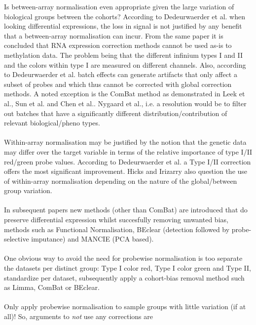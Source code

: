\documentclass[a4paper,10pt]{article}
\begin{document}
Is between-array normalisation even appropriate given the large variation of biological groups between the cohorts?
According to Dedeurwaerder et al.\cite{Dedeurwaerder2014} when looking differential expressions, the loss in signal is not justified by any benefit that a between-array normalisation can incur. From the same paper it is concluded
that RNA expression correction methods cannot be used as-is to methylation data. The problem being that the different infinium types I and II and the colors within type I are measured on different channels. Also, according to Dedeurwaerder et al. batch effects can generate artifacts that only affect a subset of probes and which thus cannot be corrected with global correction methods. A noted exception is the ComBat\cite{Johnson2007} method as demonstrated in Leek et al.\cite{Leek2010}, Sun et al.\cite{Sun2011} and
Chen et al.\cite{Chen2011}. Nygaard et al.\cite{Nygaard2015}, i.e. a resolution would be to filter out batches that have a significantly different distribution/contribution of relevant biological/pheno types.
\\ \\
%
Within-array normalisation may be justified by the notion that the genetic data may differ over the target variable in terms of the relative importance of type I/II red/green probe values. According to Dedeurwaerder et al.\cite{Dedeurwaerder2014} a Type I/II correction offers the most significant improvement. Hicks and Irizarry\cite{Hicks2014} also question the use of within-array normalisation depending on the nature of the global/between group variation.\\ \\
%
In subsequent papers new methods (other than ComBat) are introduced that do preserve differential expression whilst succesfully removing unwanted bias, methods such as Functional Normalisation, BEclear (detection followed by probe-selective imputance) 
and MANCIE (PCA based).  \\ \\
%
One obvious way to avoid the need for probewise normalisation is too separate the datasets per distinct group:
Type I color red, Type I color green and Type II, standardize per dataset, subsequently apply a cohort-bias removal method such as Limma, ComBat or BEclear. \\ \\
%
Only apply probewise normalisation to sample groups with little variation (if at all)!
%
So, arguments to \textit{not} use any corrections are 
\end{document}
